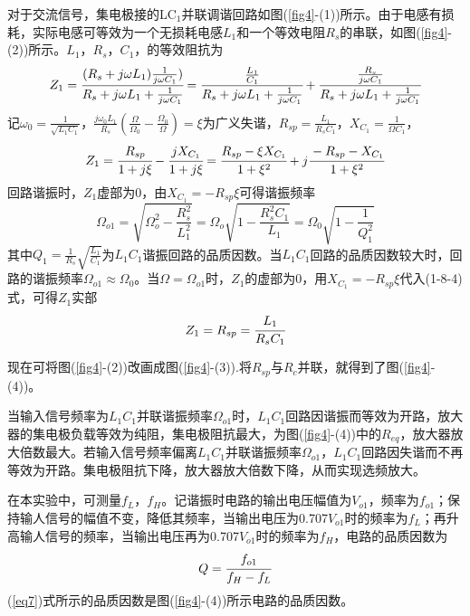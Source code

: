 \documentclass[a4paper]{article}
\begin{document}
对于交流信号，集电极接的LC$_1$并联调谐回路如图(\ref{fig4}-(1))所示。由于电感有损耗，实际电感可等效为一个无损耗电感$L_1$和一个等效电阻$R_s$的串联，如图(\ref{fig4}-(2))所示。$L_1$，$R_s$，$C_1$，的等效阻抗为
\begin{equation}
Z_1 = \cfrac{(R_s+j\omega L_1)\frac{1}{j\omega C_1})}{R_s+j\omega L_1+\frac{1}{j\omega C_1}} = \cfrac{\frac{L_1}{C_1}}{R_s+j\omega L_1+\frac{1}{j\omega C_1}} + \cfrac{\frac{R_s}{j\omega C_1}}{R_s+j\omega L_1+\frac{1}{j\omega C_1}}\label{eq3}
\end{equation}
记$\omega_0 = \frac{1}{\sqrt{L_1C_1}}$，$\frac{j\omega_0 L_1}{R_s}\left(\frac{\Omega}{\Omega_0} - \frac{\Omega_0}{\Omega}\right) = \xi$为广义失谐，$R_{sp} = \frac{L_1}{R_sC_1}$，$X_{C_1} = \frac{1}{\Omega C_1}$，
\begin{equation}
Z_1 = \cfrac{R_{sp}}{1+j\xi} - \cfrac{jX_{C_1}}{1+j\xi} = \cfrac{R_{sp} - \xi X_{C_1}}{1+\xi^2} + j\cfrac{-R_{sp}-X_{C_1}}{1+\xi^2}\label{eq4}
\end{equation}
回路谐振时，$Z_1$虚部为0，由$X_{C_1} = -R_{sp}\xi$可得谐振频率
\begin{equation}
\Omega_{o1} = \sqrt{\Omega^2_o - \frac{R_s^2}{L_1^2}} = \Omega_o\sqrt{1-\frac{R_s^2C_1}{L_1}} = \Omega_0\sqrt{1-\frac{1}{Q_1^2}}\label{eq5}
\end{equation}
其中$Q_1 = \frac{1}{R_s}\sqrt{\frac{L_1}{C_1}}$为$L_1C_1$谐振回路的品质因数。当$L_1C_1$回路的品质因数较大时，回路的谐振频率$\Omega_{o1} \approx \Omega_0$。当$\Omega = \Omega_{o1}$时，$Z_1$的虚部为0，用$X_{C_1} = -R_{sp}\xi$代入(1-8-4)式，可得$Z_1$实部
\begin{equation}
Z_1 = R_{sp} = \cfrac{L_1}{R_sC_1}\label{eq6}
\end{equation}

现在可将图(\ref{fig4}-(2))改画成图(\ref{fig4}-(3)).将$R_{sp}$与$R_c$并联，就得到了图(\ref{fig4}-(4))。

当输入信号频率为$L_1C_1$并联谐振频率$\Omega_{o1}$时，$L_1C_1$回路因谐振而等效为开路，放大器的集电极负载等效为纯阻，集电极阻抗最大，为图(\ref{fig4}-(4))中的$R_{eq}$，放大器放大倍数最大。若输入信号频率偏离$L_1C_1$并联谐振频率$\Omega_{o1}$，$L_1C_1$回路因失谐而不再等效为开路。集电极阻抗下降，放大器放大倍数下降，从而实现选频放大。

在本实验中，可测量$f_L$，$f_H$。记谐振时电路的输出电压幅值为$V_{o1}$，频率为$f_{o1}$；保持输人信号的幅值不变，降低其频率，当输出电压为0.707$V_{o1}$时的频率为$f_L$；再升高输人信号的频率，当输出电压再为0.707$V_{o1}$时的频率为$f_H$，电路的品质因数为
\begin{equation}
Q = \cfrac{f_{o1}}{f_H - f_L}\label{eq7}
\end{equation}
(\ref{eq7})式所示的品质因数是图(\ref{fig4}-(4))所示电路的品质因数。
\end{document}
